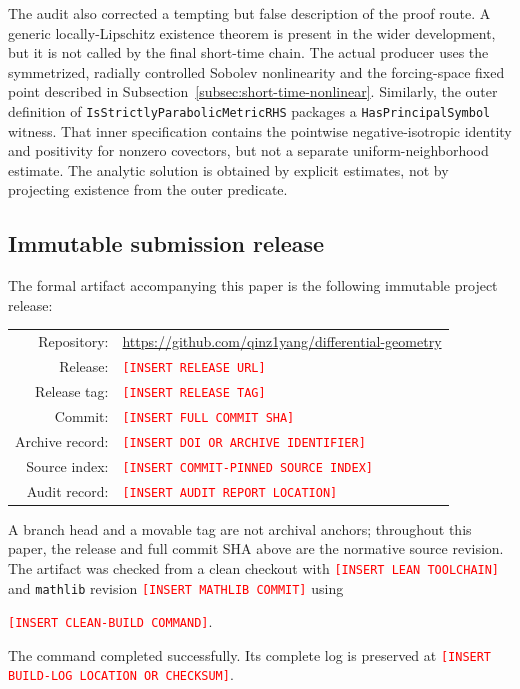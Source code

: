 \documentclass[11pt]{article}
\theoremstyle{plain}
\theoremstyle{definition}
\theoremstyle{remark}
\newcommand{\leanref}[1]{\nolinkurl{#1}}
\begin{document}
The audit also corrected a tempting but false description of the proof route.
A generic locally-Lipschitz existence theorem is present in the wider
development, but it is not called by the final short-time chain.  The actual
producer uses the symmetrized, radially controlled Sobolev nonlinearity and the
forcing-space fixed point described in
Subsection~\ref{subsec:short-time-nonlinear}.  Similarly, the outer definition
of \leanref{IsStrictlyParabolicMetricRHS} packages a
\leanref{HasPrincipalSymbol} witness.  That inner specification contains the
pointwise negative-isotropic identity and positivity for nonzero covectors,
but not a separate uniform-neighborhood estimate.  The analytic solution is
obtained by explicit estimates, not by projecting existence from the outer
predicate.

\subsection{Immutable submission release}
\label{subsec:immutable-release}

The formal artifact accompanying this paper is the following immutable project
release:
\begin{center}
\begin{tabular}{@{}rl@{}}
Repository: & \url{https://github.com/qinz1yang/differential-geometry} \\
Release: & \textcolor{red}{\texttt{[INSERT RELEASE URL]}} \\
Release tag: & \textcolor{red}{\texttt{[INSERT RELEASE TAG]}} \\
Commit: & \textcolor{red}{\texttt{[INSERT FULL COMMIT SHA]}} \\
Archive record: & \textcolor{red}{\texttt{[INSERT DOI OR ARCHIVE IDENTIFIER]}} \\
Source index: & \textcolor{red}{\texttt{[INSERT COMMIT-PINNED SOURCE INDEX]}} \\
Audit record: & \textcolor{red}{\texttt{[INSERT AUDIT REPORT LOCATION]}}
\end{tabular}
\end{center}
A branch head and a movable tag are not archival anchors; throughout this
paper, the release and full commit SHA above are the normative source revision.
The artifact was checked from a clean checkout with
\textcolor{red}{\texttt{[INSERT LEAN TOOLCHAIN]}} and
\texttt{mathlib} revision
\textcolor{red}{\texttt{[INSERT MATHLIB COMMIT]}} using
\begin{center}
  \textcolor{red}{\texttt{[INSERT CLEAN-BUILD COMMAND]}}.
\end{center}
The command completed successfully.  Its complete log is preserved at
\textcolor{red}{\texttt{[INSERT BUILD-LOG LOCATION OR CHECKSUM]}}.
\end{document}
